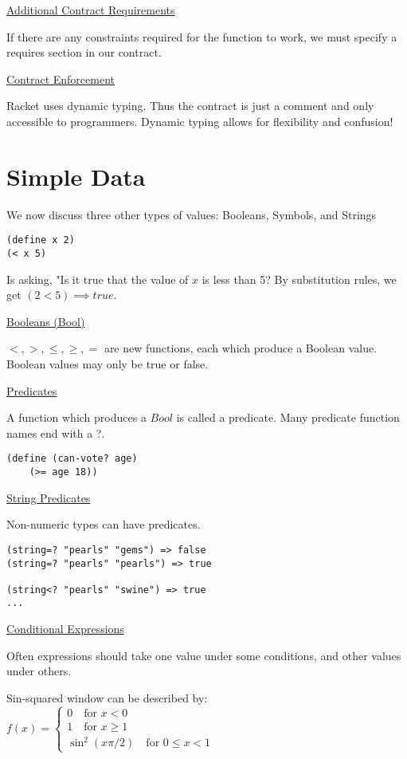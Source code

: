 \documentclass{article}
\begin{document}
\underline{Additional Contract Requirements}

If there are any constraints required for the function to work, we must specify a requires section in our contract. 

\underline{Contract Enforcement}

Racket uses dynamic typing. Thus the contract is just a comment and only accessible to programmers. Dynamic typing allows for flexibility and confusion!


\section{Simple Data}

We now discuss three other types of values: Booleans, Symbols, and Strings

\begin{lstlisting}
(define x 2)
(< x 5)
\end{lstlisting}
Is asking, "Is it true that the value of $x$ is less than 5? By substitution rules, we get $(2 < 5) \implies true$. 

\underline{Booleans (Bool)}

$<, >, \le, \ge, =$ are new functions, each which produce a Boolean value. Boolean values may only be true or false. 

\underline{Predicates}

A function which produces a $Bool$ is called a predicate. Many predicate function names end with a ?. 

\begin{lstlisting}
(define (can-vote? age)
    (>= age 18))
\end{lstlisting}

\underline{String Predicates}

Non-numeric types can have predicates. 

\begin{lstlisting}
(string=? "pearls" "gems") => false
(string=? "pearls" "pearls") => true

(string<? "pearls" "swine") => true
...
\end{lstlisting}

\underline{Conditional Expressions}

Often expressions should take one value under some conditions, and other values under others. 

Sin-squared window can be described by:
$f(x) = \begin{cases}
    0 \quad \text{for } x < 0 \\
    1 \quad \text{for } x \ge 1 \\
    \sin^2(x\pi/2) \quad \text{for } 0 \le x < 1
\end{cases}$
\end{document}
